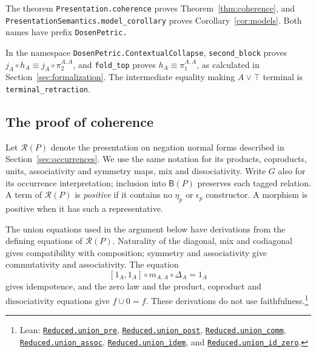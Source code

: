 \documentclass[11pt]{article}
\newcommand{\B}{\mathsf B}
\begin{document}
The theorem \texttt{Presentation.\allowbreak{}coherence} proves
Theorem~\ref{thm:coherence}, and
\texttt{PresentationSemantics.\allowbreak{}model\_corollary} proves
Corollary~\ref{cor:models}.
Both names have prefix \texttt{DosenPetric.}

In the namespace \texttt{DosenPetric.\allowbreak{}ContextualCollapse},
\texttt{second\_block} proves
$j_A\circ h_A\equiv j_A\circ\pi_2^{A,A}$, and
\texttt{fold\_top} proves
$h_A\equiv\pi_1^{A,A}$, as calculated in
Section~\ref{sec:formalization}.
The intermediate equality making $A\vee\top$ terminal is
\texttt{terminal\_retraction}.

\subsection{The proof of coherence}\label{app:coherence-proof}

Let $\mathcal R(P)$ denote the presentation on negation normal
forms described in Section~\ref{sec:occurrences}. We use the same
notation for its products, coproducts, units, associativity and
symmetry maps, mix and dissociativity. Write $G$ also for its occurrence
interpretation; inclusion into $\B(P)$ preserves each tagged
relation. A term of $\mathcal R(P)$
is \emph{positive} if it contains no $\eta_p$ or $\epsilon_p$
constructor. A morphism is positive when it has such a representative.

The union equations used in the argument below have derivations
from the defining equations of $\mathcal R(P)$.
Naturality of the diagonal, mix and codiagonal gives compatibility
with composition; symmetry and associativity give commutativity
and associativity. The equation
\[
 [1_A,1_A]\circ m_{A,A}\circ\Delta_A=1_A
\]
gives idempotence, and the zero law and the product, coproduct
and dissociativity equations give $f\cup0=f$.
These derivations do not use faithfulness.\footnote{\raggedright Lean:
\href{https://github.com/flengyel/Dosen-Petric-Maximality/blob/dosen-petric-v25-palomar-v3/DosenPetric/ReducedUnion.lean\#L80}{\texttt{Reduced.\allowbreak{}union\_pre}},
\href{https://github.com/flengyel/Dosen-Petric-Maximality/blob/dosen-petric-v25-palomar-v3/DosenPetric/ReducedUnion.lean\#L85}{\texttt{Reduced.\allowbreak{}union\_post}},
\href{https://github.com/flengyel/Dosen-Petric-Maximality/blob/dosen-petric-v25-palomar-v3/DosenPetric/ReducedUnion.lean\#L90}{\texttt{Reduced.\allowbreak{}union\_comm}},
\href{https://github.com/flengyel/Dosen-Petric-Maximality/blob/dosen-petric-v25-palomar-v3/DosenPetric/ReducedUnion.lean\#L131}{\texttt{Reduced.\allowbreak{}union\_assoc}},
\href{https://github.com/flengyel/Dosen-Petric-Maximality/blob/dosen-petric-v25-palomar-v3/DosenPetric/ReducedUnion.lean\#L97}{\texttt{Reduced.\allowbreak{}union\_idem}}, and
\href{https://github.com/flengyel/Dosen-Petric-Maximality/blob/dosen-petric-v25-palomar-v3/DosenPetric/ReducedUnion.lean\#L145}{\texttt{Reduced.\allowbreak{}union\_id\_zero}}.}
\end{document}
